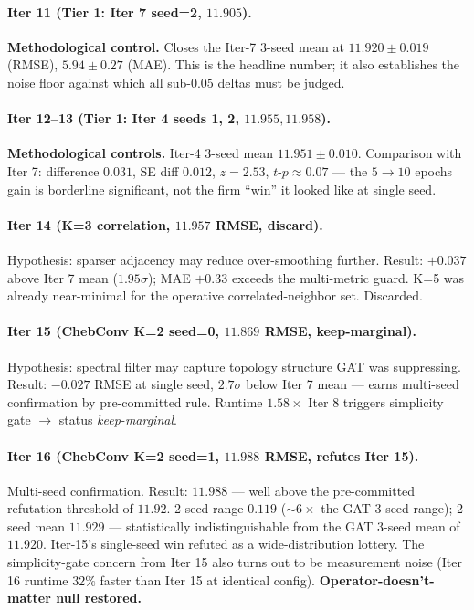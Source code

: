 \documentclass{article}
\begin{document}
\paragraph{Iter 11 (Tier 1: Iter 7 seed=2, $11.905$).}
\textbf{Methodological control.} Closes the Iter-7 3-seed mean at $11.920 \pm 0.019$ (RMSE), $5.94 \pm 0.27$ (MAE). This is the headline number; it also establishes the noise floor against which all sub-$0.05$ deltas must be judged.

\paragraph{Iter 12--13 (Tier 1: Iter 4 seeds 1, 2, $11.955, 11.958$).}
\textbf{Methodological controls.} Iter-4 3-seed mean $11.951 \pm 0.010$. Comparison with Iter 7: difference $0.031$, SE diff $0.012$, $z = 2.53$, $t$-$p \approx 0.07$ --- the $5 \to 10$ epochs gain is borderline significant, not the firm ``win'' it looked like at single seed.

\paragraph{Iter 14 (K=3 correlation, $11.957$ RMSE, discard).}
Hypothesis: sparser adjacency may reduce over-smoothing further. Result: $+0.037$ above Iter 7 mean ($1.95\sigma$); MAE $+0.33$ exceeds the multi-metric guard. K=5 was already near-minimal for the operative correlated-neighbor set. Discarded.

\paragraph{Iter 15 (ChebConv K=2 seed=0, $11.869$ RMSE, keep-marginal).}
Hypothesis: spectral filter may capture topology structure GAT was suppressing. Result: $-0.027$ RMSE at single seed, $2.7\sigma$ below Iter 7 mean --- earns multi-seed confirmation by pre-committed rule. Runtime $1.58\times$ Iter 8 triggers simplicity gate $\to$ status \emph{keep-marginal}.

\paragraph{Iter 16 (ChebConv K=2 seed=1, $11.988$ RMSE, refutes Iter 15).}
Multi-seed confirmation. Result: $11.988$ --- well above the pre-committed refutation threshold of $11.92$. 2-seed range $0.119$ ($\sim 6\times$ the GAT 3-seed range); 2-seed mean $11.929$ --- statistically indistinguishable from the GAT 3-seed mean of $11.920$. Iter-15's single-seed win refuted as a wide-distribution lottery. The simplicity-gate concern from Iter 15 also turns out to be measurement noise (Iter 16 runtime $32\%$ faster than Iter 15 at identical config). \textbf{Operator-doesn't-matter null restored.}
\end{document}
